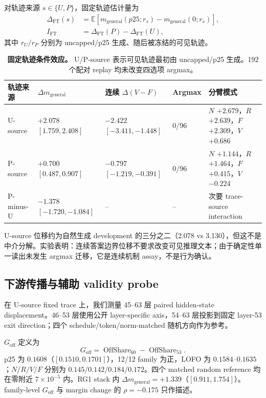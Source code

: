 \documentclass[UTF8,letterpaper,10pt,twocolumn]{ctexart}
\begin{document}
对轨迹来源 $s\in\{U,P\}$，固定轨迹估计量为
\begin{align}
\Delta_{\mathrm{FT}}(s)
&=\mathbb{E}\!\left[m_{\mathrm{general}}(p25;r_s)-m_{\mathrm{general}}(0;r_s)\right],\nonumber\\
I_{\mathrm{FT}}
&=\Delta_{\mathrm{FT}}(P)-\Delta_{\mathrm{FT}}(U),
\end{align}
其中 $r_U/r_P$ 分别为 uncapped/p25 生成、随后被冻结的可见轨迹。

\begin{table}[t]
\centering
\small
\begin{tabular}{lL{3.0cm}L{3.0cm}L{3.0cm}L{3.5cm}}
\toprule
轨迹来源 & $\Delta m_{\mathrm{general}}$ & 连续 $\Delta(V-F)$ & Argmax & 分臂模式 \\
\midrule
U-source & $+2.078$ $[1.759,2.408]$ & $-2.422$ $[-3.411,-1.448]$ & 0/96 & $N$ $+2.679$，$R$ $+2.639$，$F$ $+2.309$，$V$ $+0.686$ \\
P-source & $+0.700$ $[0.487,0.907]$ & $-0.797$ $[-1.219,-0.391]$ & 0/96 & $N$ $+1.144$，$R$ $+1.464$，$F$ $+0.415$，$V$ $-0.224$ \\
P-minus-U & $-1.378$ $[-1.720,-1.084]$ & -- & -- & 次要 trace-source interaction \\
\bottomrule
\end{tabular}
\caption{\textbf{固定轨迹条件效应。} U/P-source 表示可见轨迹最初由 uncapped/p25 生成。192 个配对 replay 均未改变四选项 argmax。}
\label{tab:supp-fixed-zh}
\end{table}

U-source 位移约为自然生成 development 的三分之二（2.078 vs 3.130），但这不是中介分解。实验表明：连续答案边界位移不要求改变可见推理文本；由于确定性单一读出未发生 argmax 迁移，它是连续机制 assay，不是行为确认。

\subsection{下游传播与辅助 validity probe}

在 U-source fixed trace 上，我们测量 45--63 层 paired hidden-state displacement。46--53 层使用公开 layer-specific axis，54--63 层投影到固定 layer-53 exit direction；四个 schedule/token/norm-matched 随机方向作为参考。

$G_{\mathrm{off}}$ 定义为
\begin{equation}
G_{\mathrm{off}}
=\operatorname{OffShare}_{60}-\operatorname{OffShare}_{53}.
\end{equation}
p25 为 $0.1608$（$[0.1510,0.1701]$），12/12 family 为正，LOFO 为 $0.1584$--$0.1635$；$N/R/V/F$ 分别为 $0.145/0.142/0.184/0.172$。四个 matched random reference 均在零附近 $7\times10^{-5}$ 内。RG1 stack 内 $\Delta m_{\mathrm{general}}=+1.339$（$[0.911,1.754]$）。family-level $G_{\mathrm{off}}$ 与 margin change 的 $\rho=-0.175$ 只作描述。
\end{document}
